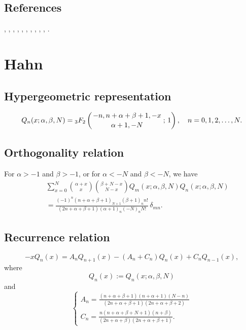 \documentclass[envcountchap,graybox]{svmono}
\newcommand{\hyp}[5]{\mbox{}_{#1}{F}_{#2}
\left(\genfrac{}{}{0pt}{}{#3}{#4}\,;\,#5\right)}
\newcommand{\hyp}[5]{\,\mbox{}_{#1}F_{#2}\!\left(
  \genfrac{}{}{0pt}{}{#3}{#4};#5\right)}
\begin{document}
\subsection*{References}
\cite{Askey85}, \cite{Askey89I}, \cite{AtakRahmanSuslov},
\cite{AtakSuslov85}, \cite{Badertscher}, \cite{Gupta91}, \cite{Koelink96II},
\cite{Koorn88}, \cite{Lesky94II}, \cite{Lesky95II}, \cite{Lesky97}.


\section{Hahn}

\par\setcounter{equation}{0}

\subsection*{Hypergeometric representation}
\begin{equation}
\label{DefHahn}
Q_n(x;\alpha,\beta,N)=\hyp{3}{2}{-n,n+\alpha+\beta+1,-x}{\alpha+1,-N}{1},\quad n=0,1,2,\ldots,N.
\end{equation}

\subsection*{Orthogonality relation}
For $\alpha>-1$ and $\beta>-1$, or for $\alpha<-N$ and $\beta<-N$, we have
\begin{eqnarray}
\label{OrtHahn}
& &\sum_{x=0}^N\binom{\alpha +x}{x}\binom{\beta+N-x}{N-x}Q_m(x;\alpha,\beta,N)Q_n(x;\alpha,\beta,N)\nonumber\\
& &{}=\frac{(-1)^n(n+\alpha+\beta+1)_{N+1}(\beta+1)_nn!}{(2n+\alpha+\beta+1)(\alpha+1)_n(-N)_nN!}\,\delta_{mn}.
\end{eqnarray}

\subsection*{Recurrence relation}
\begin{equation}
\label{RecHahn}
-xQ_n(x)=A_nQ_{n+1}(x)-\left(A_n+C_n\right)Q_n(x)+C_nQ_{n-1}(x),
\end{equation}
where
$$Q_n(x):=Q_n(x;\alpha,\beta,N)$$
and
$$\left\{\begin{array}{l}
\displaystyle A_n=\frac{(n+\alpha+\beta+1)(n+\alpha+1)(N-n)}{(2n+\alpha+\beta+1)(2n+\alpha+\beta+2)}\\[5mm]
\displaystyle C_n=\frac{n(n+\alpha+\beta+N+1)(n+\beta)}{(2n+\alpha+\beta)(2n+\alpha+\beta+1)}.
\end{array}\right.$$
\end{document}
